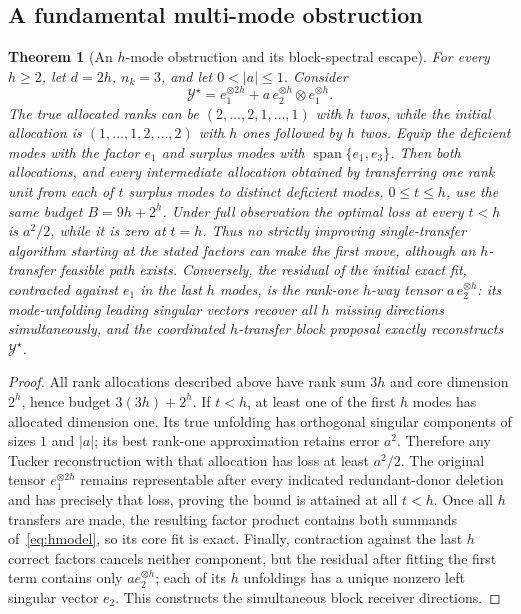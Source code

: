 \documentclass[review,10pt]{elsarticle}
\newtheorem{theorem}{Theorem}
\newcommand{\cY}{\mathcal Y}
\begin{document}
\subsection{A fundamental multi-mode obstruction}\label{subsec:obstruction}
\begin{theorem}[An $h$-mode obstruction and its block-spectral escape]\label{thm:hmode}
For every $h\ge2$, let $d=2h$, $n_k=3$, and let $0<|a|\le1$. Consider
\begin{equation}\label{eq:hmodel}
\cY^\star=e_1^{\otimes 2h}+a\,e_2^{\otimes h}\otimes e_1^{\otimes h}.
\end{equation}
The true allocated ranks can be $(2,\ldots,2,1,\ldots,1)$ with $h$ twos, while the initial allocation is $(1,\ldots,1,2,\ldots,2)$ with $h$ ones followed by $h$ twos. Equip the deficient modes with the factor $e_1$ and surplus modes with $\operatorname{span}\{e_1,e_3\}$. Then both allocations, and every intermediate allocation obtained by transferring one rank unit from each of $t$ surplus modes to distinct deficient modes, $0\le t\le h$, use the same budget $B=9h+2^h$. Under full observation the optimal loss at every $t<h$ is $a^2/2$, while it is zero at $t=h$. Thus no strictly improving single-transfer algorithm starting at the stated factors can make the first move, although an $h$-transfer feasible path exists. Conversely, the residual of the initial exact fit, contracted against $e_1$ in the last $h$ modes, is the rank-one $h$-way tensor $a\,e_2^{\otimes h}$: its mode-unfolding leading singular vectors recover all $h$ missing directions simultaneously, and the coordinated $h$-transfer block proposal exactly reconstructs $\cY^\star$.
\end{theorem}
\begin{proof}
All rank allocations described above have rank sum $3h$ and core dimension $2^h$, hence budget $3(3h)+2^h$. If $t<h$, at least one of the first $h$ modes has allocated dimension one. Its true unfolding has orthogonal singular components of sizes $1$ and $|a|$; its best rank-one approximation retains error $a^2$. Therefore any Tucker reconstruction with that allocation has loss at least $a^2/2$. The original tensor $e_1^{\otimes 2h}$ remains representable after every indicated redundant-donor deletion and has precisely that loss, proving the bound is attained at all $t<h$. Once all $h$ transfers are made, the resulting factor product contains both summands of~\eqref{eq:hmodel}, so its core fit is exact. Finally, contraction against the last $h$ correct factors cancels neither component, but the residual after fitting the first term contains only $a e_2^{\otimes h}$; each of its $h$ unfoldings has a unique nonzero left singular vector $e_2$. This constructs the simultaneous block receiver directions.\end{proof}
\end{document}
